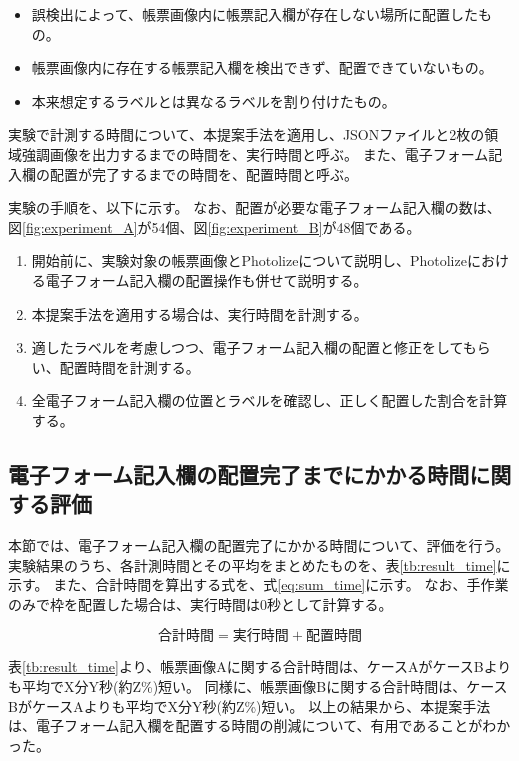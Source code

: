 \begin{itemize}
    \item 誤検出によって、帳票画像内に帳票記入欄が存在しない場所に配置したもの。
    \item 帳票画像内に存在する帳票記入欄を検出できず、配置できていないもの。
    \item 本来想定するラベルとは異なるラベルを割り付けたもの。
\end{itemize}

実験で計測する時間について、本提案手法を適用し、JSONファイルと2枚の領域強調画像を出力するまでの時間を、実行時間と呼ぶ。
また、電子フォーム記入欄の配置が完了するまでの時間を、配置時間と呼ぶ。

実験の手順を、以下に示す。
なお、配置が必要な電子フォーム記入欄の数は、図\ref{fig:experiment_A}が54個、図\ref{fig:experiment_B}が48個である。

\begin{enumerate}
    \item 開始前に、実験対象の帳票画像とPhotolizeについて説明し、Photolizeにおける電子フォーム記入欄の配置操作も併せて説明する。
    \item 本提案手法を適用する場合は、実行時間を計測する。
    \item 適したラベルを考慮しつつ、電子フォーム記入欄の配置と修正をしてもらい、配置時間を計測する。
    \item 全電子フォーム記入欄の位置とラベルを確認し、正しく配置した割合を計算する。
\end{enumerate}



\subsection{電子フォーム記入欄の配置完了までにかかる時間に関する評価}\label{subsec:evalue_required_time}
本節では、電子フォーム記入欄の配置完了にかかる時間について、評価を行う。
実験結果のうち、各計測時間とその平均をまとめたものを、表\ref{tb:result_time}に示す。
また、合計時間を算出する式を、式\ref{eq:sum_time}に示す。
なお、手作業のみで枠を配置した場合は、実行時間は0秒として計算する。

\begin{equation}\label{eq:sum_time}
    合計時間=実行時間+配置時間
\end{equation}

表\ref{tb:result_time}より、帳票画像Aに関する合計時間は、ケースAがケースBよりも平均でX分Y秒(約Z\%)短い。
同様に、帳票画像Bに関する合計時間は、ケースBがケースAよりも平均でX分Y秒(約Z\%)短い。
以上の結果から、本提案手法は、電子フォーム記入欄を配置する時間の削減について、有用であることがわかった。

